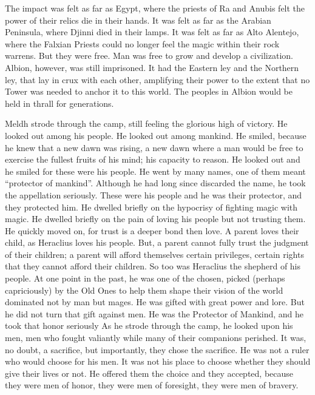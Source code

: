 The impact was felt as far as Egypt, where the priests of Ra and Anubis felt the power of their relics die in their hands. It was felt as far as the Arabian Peninsula, where Djinni died in their lamps. It was felt as far as Alto Alentejo, where the Falxian Priests could no longer feel the magic within their rock warrens. But they were free. Man was free to grow and develop a civilization.
\SomeVSpace
Albion, however, was still imprisoned. It had the Eastern ley and the Northern ley, that lay in crux with each other, amplifying their power to the extent that no Tower was needed to anchor it to this world. The peoples in Albion would be held in thrall for generations.
\pagebreak

Meldh strode through the camp, still feeling the glorious high of victory. He looked out among his people. He looked out among mankind. He smiled, because he knew that a new dawn was rising, a new dawn where a man would be free to exercise the fullest fruits of his mind; his capacity to reason. He looked out and he smiled for these were his people. He went by many names, one of them meant “protector of mankind”. Although he had long since discarded the name, he took the appellation seriously. These were his people and he was their protector, and they protected him.
\SmallVSpace
He dwelled briefly on the hypocrisy of fighting magic with magic. He dwelled briefly on the pain of loving his people but not trusting them. He quickly moved on, for trust is a deeper bond then love. A parent loves their child, as Heraclius loves his people. But, a parent cannot fully trust the judgment of their children; a parent will afford themselves certain privileges, certain rights that they cannot afford their children. So too was Heraclius the shepherd of his people. At one point in the past, he was one of the chosen, picked (perhaps capriciously) by the Old Ones to help them shape their vision of the world dominated not by man but mages. He was gifted with great power and lore. But he did not turn that gift against men. He was the Protector of Mankind, and he took that honor seriously
\SmallVSpace
As he strode through the camp, he looked upon his men, men who fought valiantly while many of their companions perished. It was, no doubt, a sacrifice, but importantly, they chose the sacrifice. He was not a ruler who would choose for his men. It was not his place to choose whether they should give their lives or not. He offered them the choice and they accepted, because they were men of honor, they were men of foresight, they were men of bravery.

